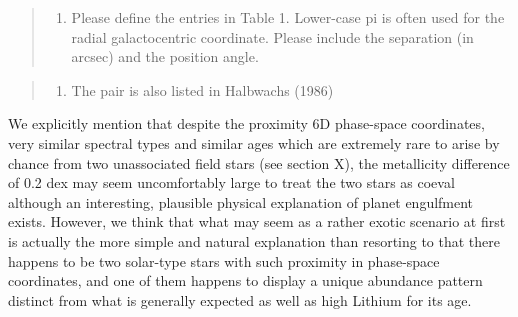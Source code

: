 \documentclass[12pt]{article}
\begin{document}
\begin{quote}
\begin{enumerate}
\def\labelenumi{\arabic{enumi}.}
\setcounter{enumi}{1}
\itemsep1pt\parskip0pt
\item
  Please define the entries in Table 1. Lower-case pi is often used for
  the radial galactocentric coordinate. Please include the separation
  (in arcsec) and the position angle.
\end{enumerate}
\end{quote}

\begin{quote}
\begin{enumerate}
\def\labelenumi{\arabic{enumi}.}
\setcounter{enumi}{2}
\itemsep1pt\parskip0pt
\item
  The pair is also listed in Halbwachs (1986)
\end{enumerate}
\end{quote}

We explicitly mention that despite the proximity 6D phase-space
coordinates, very similar spectral types and similar ages which are
extremely rare to arise by chance from two unassociated field stars (see
section X), the metallicity difference of 0.2 dex may seem uncomfortably
large to treat the two stars as coeval although an interesting,
plausible physical explanation of planet engulfment exists. However, we
think that what may seem as a rather exotic scenario at first is
actually the more simple and natural explanation than resorting to that
there happens to be two solar-type stars with such proximity in
phase-space coordinates, and one of them happens to display a unique
abundance pattern distinct from what is generally expected as well as
high Lithium for its age.

%

\end{document}
